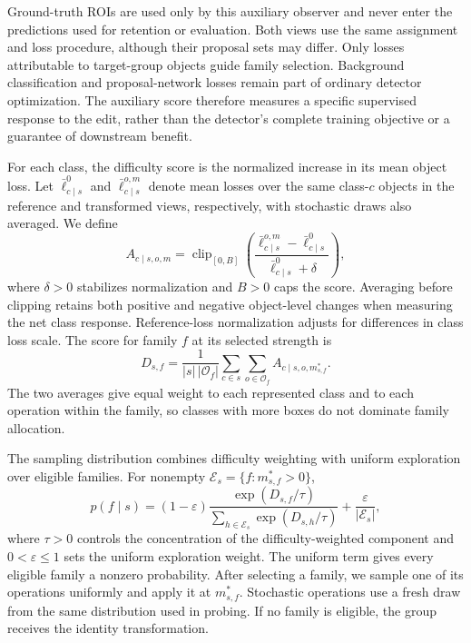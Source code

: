 \documentclass[conference]{IEEEtran}
\begin{document}
Ground-truth ROIs are used only by this auxiliary observer and never enter the predictions used for retention or evaluation. Both views use the same assignment and loss procedure, although their proposal sets may differ. Only losses attributable to target-group objects guide family selection. Background classification and proposal-network losses remain part of ordinary detector optimization. The auxiliary score therefore measures a specific supervised response to the edit, rather than the detector's complete training objective or a guarantee of downstream benefit.

For each class, the difficulty score is the normalized increase in its mean object loss. Let $\bar\ell^0_{c\mid s}$ and $\bar\ell^{o,m}_{c\mid s}$ denote mean losses over the same class-$c$ objects in the reference and transformed views, respectively, with stochastic draws also averaged. We define
\begin{equation}
 A_{c\mid s,o,m}=\operatorname{clip}_{[0,B]}
 \left(\frac{\bar\ell^{o,m}_{c\mid s}-\bar\ell^0_{c\mid s}}
 {\bar\ell^0_{c\mid s}+\delta}\right),
 \label{eq:class_difficulty}
\end{equation}
where $\delta>0$ stabilizes normalization and $B>0$ caps the score. Averaging before clipping retains both positive and negative object-level changes when measuring the net class response. Reference-loss normalization adjusts for differences in class loss scale. The score for family $f$ at its selected strength is
\begin{equation}
 D_{s,f}=\frac{1}{|s|\,|\mathcal{O}_f|}
 \sum_{c\in s}\sum_{o\in\mathcal{O}_f}
 A_{c\mid s,o,m^*_{s,f}}.
 \label{eq:family_score}
\end{equation}
The two averages give equal weight to each represented class and to each operation within the family, so classes with more boxes do not dominate family allocation.

The sampling distribution combines difficulty weighting with uniform exploration over eligible families. For nonempty $\mathcal{E}_s=\{f:m^*_{s,f}>0\}$,
\begin{equation}
 p(f\mid s)=(1-\varepsilon)
 \frac{\exp(D_{s,f}/\tau)}
      {\sum_{h\in\mathcal{E}_s}\exp(D_{s,h}/\tau)}
 +\frac{\varepsilon}{|\mathcal{E}_s|},
 \label{eq:family_probability}
\end{equation}
where $\tau>0$ controls the concentration of the difficulty-weighted component and $0<\varepsilon\leq1$ sets the uniform exploration weight. The uniform term gives every eligible family a nonzero probability. After selecting a family, we sample one of its operations uniformly and apply it at $m^*_{s,f}$. Stochastic operations use a fresh draw from the same distribution used in probing. If no family is eligible, the group receives the identity transformation.
\end{document}
